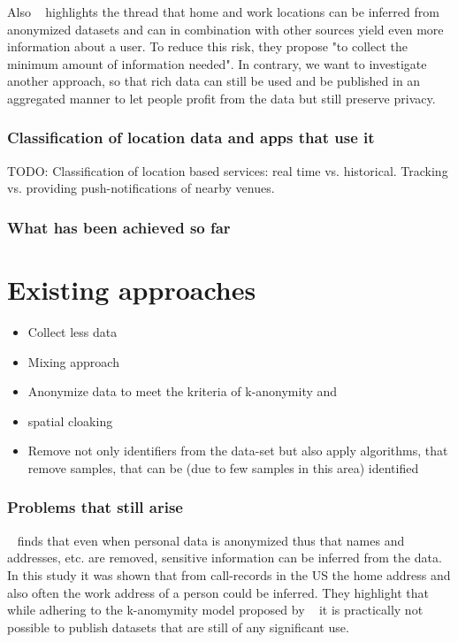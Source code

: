 Also ~\parencite{privacy-home-work-pairs} highlights the thread that home and work locations can be inferred from anonymized datasets and can in combination with other sources yield even more information about a user. To reduce this risk, they propose "to collect the minimum amount of information needed". In contrary, we want to investigate another approach, so that rich data can still be used and be published in an aggregated manner to let people profit from the data but still preserve privacy.


\subsubsection{Classification of location data and apps that use it}


TODO: Classification of location based services: real time vs. historical. Tracking vs. providing push-notifications of nearby venues. 

\subsubsection{What has been achieved so far}

\section{Existing approaches}

\begin{itemize}
  \item Collect less data \parencite{privacy-home-work-pairs}
  \item Mixing approach \parencite{location-privacy}
  \item Anonymize data to meet the kriteria of k-anonymity \parencite{k-anonymity} and \parencite{cellphone}
  \item spatial cloaking \parencite{krumm}
  \item Remove not only identifiers from the data-set but also apply algorithms, that remove samples, that can be (due to few samples in this area) identified \parencite{time-to-confusion}
\end{itemize}

\subsubsection{Problems that still arise}

~\parencite{cellphone} finds that even when personal data is anonymized thus that names and addresses, etc. are removed, sensitive information can be inferred from the data.
In this study it was shown that from call-records in the US the home address and also often the work address of a person could be inferred.
They highlight that while adhering to the k-anomymity model proposed by ~\parencite{k-anonymity} it is practically not possible to publish datasets that are still of any significant use.
\\

